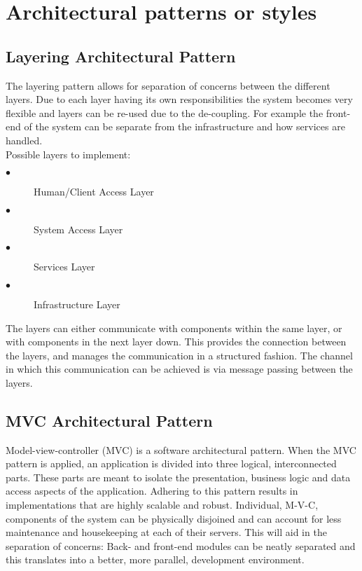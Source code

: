 \documentclass[12pt]{article}
\begin{document}
\section{Architectural patterns or styles}
\subsection{Layering Architectural Pattern}
The layering pattern allows for separation of concerns between the different layers. Due to each layer having its own responsibilities the system becomes very flexible and layers can be re-used due to the de-coupling. For example the front-end of the system can be separate from the infrastructure and how services are handled.\\
Possible layers to implement: 
\begin{description}
\item[$\bullet$]Human/Client Access Layer
\item[$\bullet$]System Access Layer
\item[$\bullet$]Services Layer
\item[$\bullet$]Infrastructure Layer
\end{description}
The layers can either communicate with components within the same layer, or with components in the next layer down. This provides the connection between the layers, and manages the communication
in a structured fashion. The channel in which this communication can be achieved is via message passing between the layers.

\subsection{MVC Architectural Pattern}
Model-view-controller (MVC) is a software architectural pattern. When the MVC pattern is applied, an application is divided into three logical, interconnected parts. These parts are meant to isolate the presentation, business logic and data access aspects of the application. Adhering to this pattern results in implementations that are highly scalable and robust. Individual, M-V-C, components of the system can be physically disjoined and can account for less maintenance and housekeeping at each of their servers. This will aid in the separation of concerns: Back- and front-end modules can be neatly separated and this translates into a better, more parallel, development environment.
\end{document}
